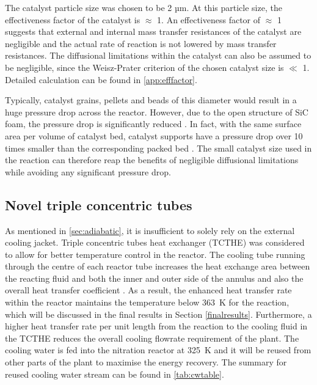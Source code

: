 The catalyst particle size was chosen to be 2 µm. At this particle size, the effectiveness factor of the catalyst is $\approx$ 1. An effectiveness factor of $\approx$ 1 suggests that external and internal mass transfer resistances of the catalyst are negligible and the actual rate of reaction is not lowered by mass transfer resistances. The diffusional limitations within the catalyst can also be assumed to be negligible, since the Weisz-Prater criterion of the chosen catalyst size is $\ll$ 1. Detailed calculation can be found in \cref{app:efffactor}.

Typically, catalyst grains, pellets and beads of this diameter would result in a huge pressure drop across the reactor. However, due to the open structure of SiC foam, the pressure drop is significantly reduced \cite{duong-viet_silicon_2016}. In fact, with the same surface area per volume of catalyst bed, catalyst supports have a pressure drop over 10 times smaller than the corresponding packed bed \cite{richardson_properties_2000}. The small catalyst size used in the reaction can therefore reap the benefits of negligible diffusional limitations while avoiding any significant pressure drop.


\subsection{Novel triple concentric tubes}
\label{sec:tripleconctube}
As mentioned in \cref{sec:adiabatic}, it is insufficient to solely rely on the external cooling jacket. Triple concentric tubes heat exchanger (TCTHE) was considered to allow for better temperature control in the reactor. The cooling tube running through the centre of each reactor tube increases the heat exchange area between the reacting fluid and both the inner and outer side of the annulus and also the overall heat transfer coefficient \cite{moya-rico_characterization_2019}. As a result, the enhanced heat transfer rate within the reactor maintains the temperature below \SI{363}{\K} for the reaction, which will be discussed in the final results in Section \ref{finalresults}. Furthermore, a higher heat transfer rate per unit length from the reaction to the cooling fluid in the TCTHE reduces the overall cooling flowrate requirement of the plant. The cooling water is fed into the nitration reactor at \SI{325}{\K} and it will be reused from other parts of the plant to maximise the energy recovery. The summary for reused cooling water stream can be found in \cref{tab:cwtable}.
